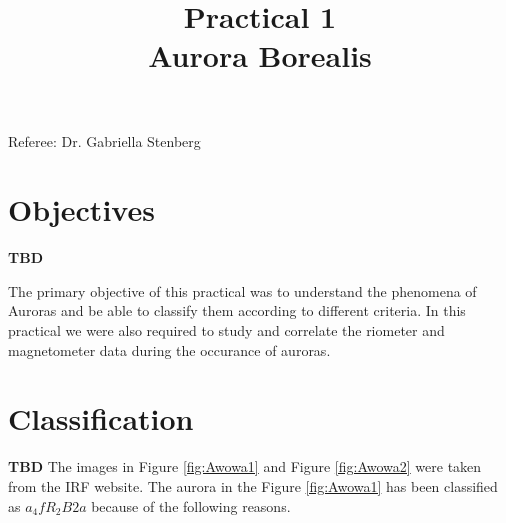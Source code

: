 \documentclass{article}
\title{Practical 1\\ Aurora Borealis} %
\author{\authors}
\begin{document}
\maketitle %

\centerline{Referee: Dr. Gabriella Stenberg}

\setlength\parindent{0pt} %

\renewcommand{\labelenumi}{\alph{enumi}.} %
\clearpage

\tableofcontents

\listoffigures

\clearpage


\section{Objectives}

\textbf{TBD}

The primary objective of this practical was to understand the phenomena of Auroras and be able to classify them according to different criteria. In this practical we were also required to study and correlate the riometer and magnetometer data during the occurance of auroras.

 

\section{Classification}

\textbf{TBD}
The images in Figure \ref{fig:Awowa1} and Figure \ref{fig:Awowa2} were taken from the IRF website. 
The aurora in the Figure \ref{fig:Awowa1} has been classified as $a_4fR_2B2a$ because of the following reasons.
\end{document}
